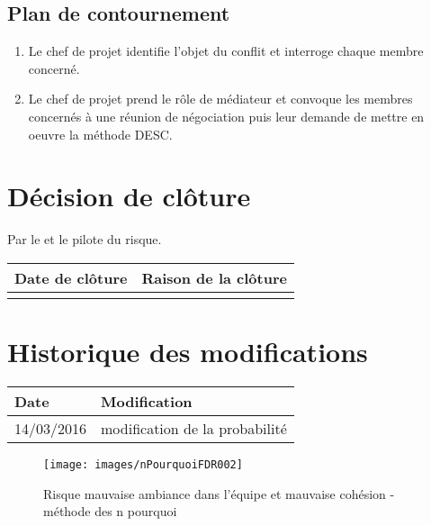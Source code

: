 \flushleft
\subsection*{Plan de contournement}

\begin{enumerate}
	\item Le chef de projet identifie l'objet du conflit et interroge chaque membre concerné.
	\item Le chef de projet prend le rôle de médiateur et convoque les membres concernés à une réunion de négociation puis leur demande de mettre en oeuvre la méthode DESC.
\end{enumerate}

\section*{Décision de clôture}
Par le \CP{} et le pilote du risque.
\begin{table}[H]
\centering
	\begin{tabularx}{16.8cm}{|X|X|}
	\hline
	\rowcolor{gray!40} Date de clôture & Raison de la clôture \\
	\hline
	  & \\
	\hline
	\end{tabularx}
\end{table}

\section*{Historique des modifications}
\begin{table}[H]
\centering
	\begin{tabularx}{16.8cm}{|X|X|}
	\hline
	\rowcolor{gray!40} Date & Modification \\
	\hline
	 14/03/2016 & modification de la probabilité\\
	\hline
	\end{tabularx}
\end{table}
\newpage

\begin{figure}
	\centering
	\texttt{[image: images/nPourquoiFDR002]}
	\caption{\label{risque mauvaise ambiance dans l'équipe et mauvaise cohesion}Risque mauvaise ambiance dans l'équipe et mauvaise cohésion - méthode des n pourquoi}
\end{figure}

